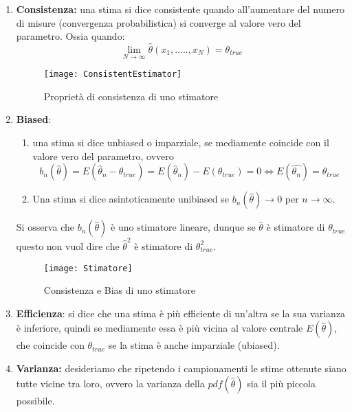 \begin{enumerate}
	\item \textbf{Consistenza:} una stima si dice consistente quando all'aumentare del numero di misure (convergenza probabilistica) si converge al valore vero del parametro. Ossia quando:
	\begin{equation}
		\lim_{N \rightarrow \infty} \hat{\theta}(x_1,.....,x_N) = \theta_{true} 
	\end{equation}
	 
\begin{figure}[ht]
\vspace{0.6in}
\texttt{[image: ConsistentEstimator]}	
\centering
\vspace{0.3in}
\caption{Propriet\`{a} di consistenza di uno stimatore}
\end{figure}
	
	\item \textbf{Biased}: 
	\begin{enumerate}
	\item una stima si dice unbiased o imparziale, se mediamente coincide con il valore vero del parametro, ovvero 
	\begin{equation}
		b_{n}(\hat{\theta}) = E(\hat{\theta}_n - \theta_{true}) = E(\hat{\theta}_n) - E(\theta_{true}) = 0 
		\iff E(\hat{\theta_n}) = \theta_{true} 
	\end{equation}
	
	\item Una stima si dice asintoticamente unibiased se $b_n(\hat{\theta}) \rightarrow 0$ per $n \rightarrow \infty $.\newline
	\end{enumerate}
	Si osserva che $b_n{}(\hat{\theta})$ \`{e} uno stimatore lineare, dunque se $\hat{\theta}$ \`{e} stimatore di $\theta_{true}$ questo non vuol dire che $\hat{\theta}^2$ \`{e} stimatore di $\theta_{true}^2$.
	
	 
\begin{figure}[!ht]
\vspace{0.3in}
\texttt{[image: Stimatore]}	
\centering
\vspace{0.3in}
\caption{Consistenza e Bias di uno stimatore}
\end{figure}
	
\item \textbf{Efficienza}: si dice che una stima \`{e} pi\`{u} efficiente di un'altra se la sua varianza \`{e} inferiore, quindi se mediamente essa \`{e} pi\`{u} vicina al valore centrale $E(\hat{\theta})$, che coincide con $\theta_{true}$ se la stima \`{e} anche imparziale (ubiased). 

\item \textbf{Varianza:} desideriamo che ripetendo i campionamenti le stime ottenute siano tutte vicine tra loro, ovvero la varianza della $pdf(\hat{\theta})$ sia il pi\`{u} piccola possibile.
\end{enumerate}

